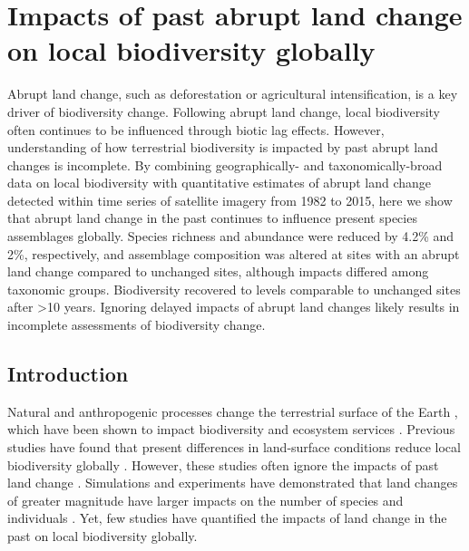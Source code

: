 \chapter{Impacts of past abrupt land change on local biodiversity globally}
\label{C03}
Abrupt land change, such as deforestation or agricultural intensification, is a key driver of biodiversity change. Following abrupt land change, local biodiversity often continues to be influenced through biotic lag effects. However, understanding of how terrestrial biodiversity is impacted by past abrupt land changes is incomplete. By combining geographically- and taxonomically-broad data on local biodiversity with quantitative estimates of abrupt land change detected within time series of satellite imagery from 1982 to 2015, here we show that abrupt land change in the past continues to influence present species assemblages globally. Species richness and abundance were reduced by 4.2\% and 2\%, respectively, and assemblage composition was altered at sites with an abrupt land change compared to unchanged sites, although impacts differed among taxonomic groups. Biodiversity recovered to levels comparable to unchanged sites after >10 years. Ignoring delayed impacts of abrupt land changes likely results in incomplete assessments of biodiversity change.

\section{Introduction}
\label{C03_01}
Natural and anthropogenic processes change the terrestrial surface of the Earth \citep{Ellis2013,Song2018}, which have been shown to impact biodiversity \citep{Newbold2015,Jung2018} and ecosystem services \citep{Isbell2015}. Previous studies have found that present differences in land-surface conditions reduce local biodiversity globally \citep{Gibson2011,Newbold2015}. However, these studies often ignore the impacts of past land change \citep{Foster2003,Watson2014}. Simulations and experiments have demonstrated that land changes of greater magnitude have larger impacts on the number of species and individuals \citep{Dornelas2010,Hautier2015,Santini2016}. Yet, few studies have quantified the impacts of land change in the past on local biodiversity globally.

